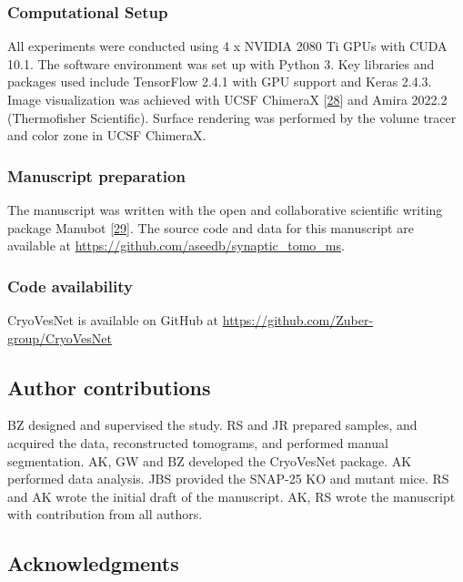 \hypertarget{computational-setup}{%
\subsubsection{Computational Setup}\label{computational-setup}}

All experiments were conducted using 4 x NVIDIA 2080 Ti GPUs with CUDA 10.1.
The software environment was set up with Python 3.
Key libraries and packages used include TensorFlow 2.4.1 with GPU support and Keras 2.4.3.
Image visualization was achieved with UCSF ChimeraX {[}\protect\hyperlink{ref-k53Adxgo}{28}{]} and Amira 2022.2 (Thermofisher Scientific).
Surface rendering was performed by the volume tracer and color zone in UCSF ChimeraX.

\hypertarget{manuscript-preparation}{%
\subsubsection{Manuscript preparation}\label{manuscript-preparation}}

The manuscript was written with the open and collaborative scientific writing package Manubot {[}\protect\hyperlink{ref-YuJbg3zO}{29}{]}.
The source code and data for this manuscript are available at \url{https://github.com/aseedb/synaptic_tomo_ms}.

\hypertarget{code-availability}{%
\subsubsection{Code availability}\label{code-availability}}

CryoVesNet is available on GitHub at \url{https://github.com/Zuber-group/CryoVesNet}

\hypertarget{author-contributions}{%
\subsection{Author contributions}\label{author-contributions}}

BZ designed and supervised the study.
RS and JR prepared samples, and acquired the data, reconstructed tomograms, and performed manual segmentation.
AK, GW and BZ developed the CryoVesNet package.
AK performed data analysis.
JBS provided the SNAP-25 KO and mutant mice.
RS and AK wrote the initial draft of the manuscript.
AK, RS wrote the manuscript with contribution from all authors.

\hypertarget{acknowledgments}{%
\subsection{Acknowledgments}\label{acknowledgments}}

